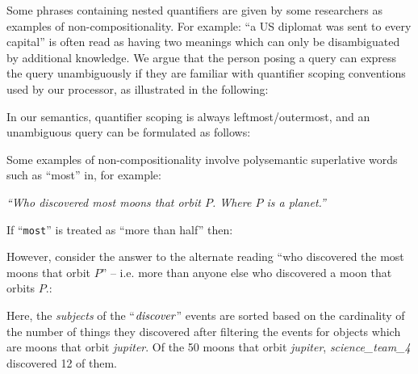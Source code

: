 \documentclass[../main.tex]{subfiles}
\begin{document}
\begin{refsection}
Some phrases containing nested quantifiers are given by some researchers as examples of non-compositionality. For example: ``a US diplomat was sent to every capital'' is often read as having two meanings which can only be disambiguated by additional knowledge. We argue that the person posing a query can express the query unambiguously if they are familiar with quantifier scoping conventions used by our processor, as illustrated in the following:

\examplespacing


\examplespacing

\noindent In our semantics, quantifier scoping is always leftmost/outermost, and an unambiguous query can be formulated as follows:

\examplespacing


\examplespacing

\noindent Some examples of non-compositionality involve polysemantic superlative words such as ``most'' in, for example:
\begin{center}
	\vspace{-0.25em}
	\textit{``Who discovered most moons that orbit $P$. Where $P$ is a planet.''}
	\vspace{-0.25em}
\end{center}
If ``\texttt{most}'' is treated as ``more than half'' then:

\examplespacing


\examplespacing

\noindent However, consider the answer to the alternate reading ``who discovered the most moons that orbit $P$'' – i.e. more than anyone else who discovered a moon that orbits $P$.:

\examplespacing


\examplespacing

\noindent Here, the \textit{subjects} of the ``$\operatorname{\mathit{discover}}$'' events are sorted based on the cardinality of the number of things they discovered after filtering the events for objects which are moons that orbit \textit{jupiter}.  Of the 50 moons that orbit \textit{jupiter}, \textit{science\_team\_4} discovered 12 of them.


\end{refsection}
\end{document}
